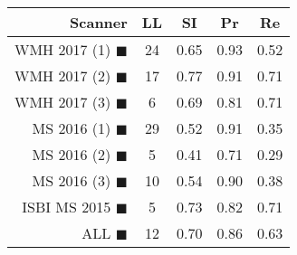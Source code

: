 \begin{tabular}{rcccc}
\toprule
Scanner & LL & SI & Pr & Re \\
\midrule
WMH 2017 (1) {\color[rgb]{ 1.00 0.00 0.00}$\blacksquare$} & 24 & 0.65 & 0.93 & 0.52 \\
WMH 2017 (2) {\color[rgb]{ 1.00 0.50 0.00}$\blacksquare$} & 17 & 0.77 & 0.91 & 0.71 \\
WMH 2017 (3) {\color[rgb]{ 1.00 0.80 0.00}$\blacksquare$} & 6 & 0.69 & 0.81 & 0.71 \\
MS  2016 (1) {\color[rgb]{ 0.20 0.80 0.00}$\blacksquare$} & 29 & 0.52 & 0.91 & 0.35 \\
MS  2016 (2) {\color[rgb]{ 0.00 0.40 1.00}$\blacksquare$} & 5 & 0.41 & 0.71 & 0.29 \\
MS  2016 (3) {\color[rgb]{ 0.60 0.00 1.00}$\blacksquare$} & 10 & 0.54 & 0.90 & 0.38 \\
ISBI MS 2015 {\color[rgb]{ 1.00 0.00 1.00}$\blacksquare$} & 5 & 0.73 & 0.82 & 0.71 \\
\midrule
ALL {\color[rgb]{ 1.00 1.00 1.00}$\blacksquare$} & 12 & 0.70 & 0.86 & 0.63 \\
\bottomrule
\end{tabular}